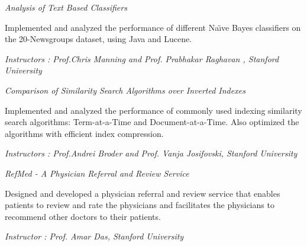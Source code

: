 \documentclass[10pt]{article}
\newcommand{\spc}{\vspace{2mm}}
\begin{document}
\textit{Analysis of Text Based Classifiers}
\begin{compactitem}
\item {Implemented and analyzed the performance of different Na\"{\i}ve Bayes classifiers on the 20-Newsgroups dataset, using Java and Lucene.}
\item \emph{Instructors :  Prof.Chris Manning and Prof. Prabhakar Raghavan , Stanford University}
\end{compactitem}
\spc

\textit{Comparison of Similarity Search Algorithms over Inverted Indexes}
\begin{compactitem}
\item {Implemented and analyzed the performance of commonly used indexing similarity search algorithms: Term-at-a-Time and Document-at-a-Time. Also optimized the algorithms  with efficient index compression.}
\item \emph{Instructors :  Prof.Andrei Broder and Prof. Vanja Josifovski, Stanford University}
\end{compactitem}
\spc





\textit{RefMed - A Physician Referral and Review Service}
\begin{compactitem}
\item {Designed and developed a physician referral and review service that enables patients to review and rate the physicians and facilitates the physicians to recommend other doctors to their patients.}
\item \emph{Instructor :  Prof. Amar Das, Stanford University}
\end{compactitem}
\spc
\end{document}
